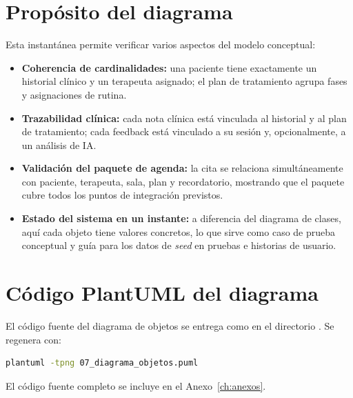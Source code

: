 \section{Propósito del diagrama}

Esta instantánea permite verificar varios aspectos del modelo conceptual:

\begin{itemize}
  \item \textbf{Coherencia de cardinalidades:} una paciente tiene exactamente un historial clínico y un terapeuta asignado; el plan de tratamiento agrupa fases y asignaciones de rutina.
  \item \textbf{Trazabilidad clínica:} cada nota clínica está vinculada al historial y al plan de tratamiento; cada feedback está vinculado a su sesión y, opcionalmente, a un análisis de IA.
  \item \textbf{Validación del paquete de agenda:} la cita se relaciona simultáneamente con paciente, terapeuta, sala, plan y recordatorio, mostrando que el paquete cubre todos los puntos de integración previstos.
  \item \textbf{Estado del sistema en un instante:} a diferencia del diagrama de clases, aquí cada objeto tiene valores concretos, lo que sirve como caso de prueba conceptual y guía para los datos de \textit{seed} en pruebas e historias de usuario.
\end{itemize}

\section{Código PlantUML del diagrama}

El código fuente del diagrama de objetos se entrega como  en el directorio . Se regenera con:

\begin{lstlisting}[language=bash]
plantuml -tpng 07_diagrama_objetos.puml
\end{lstlisting}

El código fuente completo se incluye en el Anexo~\ref{ch:anexos}.
